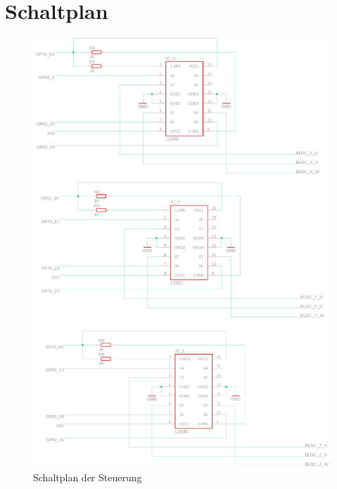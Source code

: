 \documentclass[12pt,a4paper,bibliography=totocnumbered,listof=totocnumbered]{scrartcl}
\begin{document}
\section{Schaltplan}
\begin{figure}[th]
	\centering
	\includegraphics[width=0.7\linewidth]{ICschaltung.PNG}
	\caption{Schaltplan der Steuerung}
	\label{fig:mikrocontroller-schaltung}
\end{figure}
\renewcommand\refname{Literaturverzeichnis}



\newpage


\listoffigures

\listoftables
\end{document}
